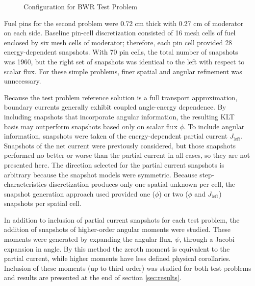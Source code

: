\documentclass[5p,times,twocolumn,10pt]{elsarticle}
\begin{document}
\begin{figure*}[htb]
\begin{minipage}[c]{\textwidth}
        \end{minipage}
        \caption{Configuration for BWR Test Problem}
        \label{fig:BWRconfig}
    \end{figure*}  
    
    Fuel pins for the second problem were 0.72 cm thick with 0.27 cm of 
    moderator on each side. Baseline pin-cell discretization consisted of 16 
    mesh cells of fuel enclosed by six mesh cells of moderator; therefore, each 
    pin cell provided 28 energy-dependent snapshots. With 70 pin cells, the 
    total number of snapshots was 1960, but the right set of snapshots was 
    identical to the left with respect to scalar flux.  For these 
    simple problems, finer spatial and angular refinement was unnecessary.
    
    Because the test problem reference solution is a full transport 
    approximation, boundary currents generally exhibit coupled angle-energy 
    dependence.  By including snapshots that incorporate angular information, 
    the resulting KLT basis may outperform snapshots based only on scalar flux 
    $\phi$.  To include angular information, snapshots were taken of the 
    energy-dependent partial current $J_{\text{left}}$.  Snapshots of the net 
    current were previously considered, but those snapshots performed no better 
    or worse than the partial current in all cases, so they are not presented 
    here.  The direction selected for the partial current snapshots is 
    arbitrary because the snapshot 
    models were symmetric. Because step-characteristics discretization produces 
    only one spatial unknown per cell, the snapshot generation approach used 
    provided one ($\phi$) or two ($\phi$ and $J_{\text{left}}$) snapshots per 
    spatial cell.
    
    In addition to inclusion of partial current snapshots for each test 
    problem, the addition of snapshots of higher-order angular moments were 
    studied.  These moments were generated by expanding the angular flux, 
    $\psi$, through a Jacobi expansion in angle.  By this method the zeroth 
    moment is equivalent to the partial current, while higher moments have less 
    defined physical corollaries.  Inclusion of these moments (up to third 
    order) was studied for both test problems and results are presented at the 
    end of section \ref{sec:results}.
    
\end{document}
